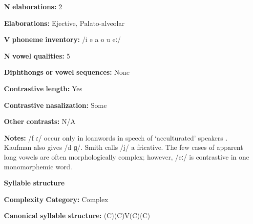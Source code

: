 \documentclass[output=paper]{langsci/langscibook}
\begin{document}
\begin{styleBody}
\textbf{N} \textbf{elaborations:} 2
\end{styleBody}

\begin{styleBody}
\textbf{Elaborations:} Ejective, Palato-alveolar
\end{styleBody}

\begin{styleBody}
\textbf{V} \textbf{phoneme} \textbf{inventory:} /i e a o u eː/
\end{styleBody}

\begin{styleBody}
\textbf{N} \textbf{vowel} \textbf{qualities:} 5
\end{styleBody}

\begin{styleBody}
\textbf{Diphthongs} \textbf{or} \textbf{vowel} \textbf{sequences:} None
\end{styleBody}

\begin{styleBody}
\textbf{Contrastive} \textbf{length:} Yes
\end{styleBody}

\begin{styleBody}
\textbf{Contrastive} \textbf{nasalization:} Some
\end{styleBody}

\begin{styleBody}
\textbf{Other} \textbf{contrasts:} N/A
\end{styleBody}

\begin{styleBody}
\textbf{Notes:} /f ɾ/ occur only in loanwords in speech of ‘acculturated’ speakers \citep[13]{Kaufman1971}. Kaufman also gives /d ɡ/. Smith calls /j/ a fricative. The few cases of apparent long vowels are often morphologically complex; however, /eː/ is contrastive in one monomorphemic word.
\end{styleBody}

\begin{styleBody}
\textbf{Syllable} \textbf{structure}
\end{styleBody}

\begin{styleBody}
\textbf{Complexity} \textbf{Category:} Complex
\end{styleBody}

\begin{styleBody}
\textbf{Canonical} \textbf{syllable} \textbf{structure:} (C)(C)V(C)(C) \citep[9-15]{Kaufman1971}
\end{styleBody}
\end{document}
